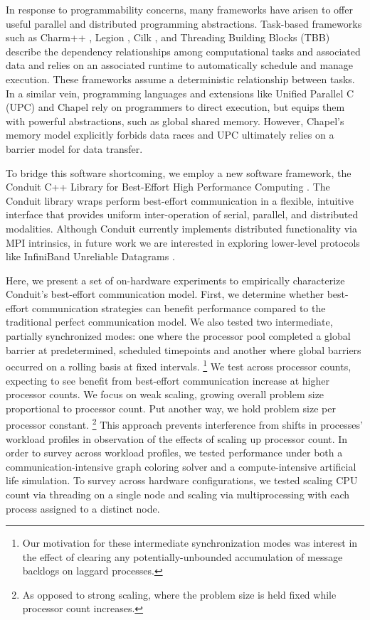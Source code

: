 In response to programmability concerns, many frameworks have arisen to offer useful parallel and distributed programming abstractions.
Task-based frameworks such as Charm++ \cite{kale1993charm++}, Legion \cite{bauer2012legion}, Cilk \cite{blumofe1996cilk}, and Threading Building Blocks (TBB) \cite{reinders2007intel} describe the dependency relationships among computational tasks and associated data and relies on an associated runtime to automatically schedule and manage execution.
These frameworks assume a deterministic relationship between tasks.
In a similar vein, programming languages and extensions like Unified Parallel C (UPC) \cite{el2006upc} and Chapel \cite{chamberlain2007parallel} rely on programmers to direct execution, but equips them with powerful abstractions, such as global shared memory.
However, Chapel's memory model explicitly forbids data races and UPC ultimately relies on a barrier model for data transfer.

To bridge this software shortcoming, we employ a new software framework, the Conduit C++ Library for Best-Effort High Performance Computing \cite{moreno2021conduit}.
The Conduit library wraps perform best-effort communication in a flexible, intuitive interface that provides uniform inter-operation of serial, parallel, and distributed modalities.
Although Conduit currently implements distributed functionality via MPI intrinsics, in future work we are interested in exploring lower-level protocols like InfiniBand Unreliable Datagrams \cite{kashyap2006ip, koop2007high}.

Here, we present a set of on-hardware experiments to empirically characterize Conduit's best-effort communication model.
First, we determine whether best-effort communication strategies can benefit performance compared to the traditional perfect communication model.
We also tested two intermediate, partially synchronized modes: one where the processor pool completed a global barrier at predetermined, scheduled timepoints and another where global barriers occurred on a rolling basis at fixed intervals.
\footnote{
Our motivation for these intermediate synchronization modes was interest in the effect of clearing any potentially-unbounded accumulation of message backlogs on laggard processes.
}
We test across processor counts, expecting to see benefit from best-effort communication increase at higher processor counts.
We focus on weak scaling, growing overall problem size proportional to processor count.
Put another way, we hold problem size per processor constant.
\footnote{
As opposed to strong scaling, where the problem size is held fixed while processor count increases.
}
This approach prevents interference from shifts in processes' workload profiles in observation of the effects of scaling up processor count.
In order to survey across workload profiles, we tested performance under both a communication-intensive graph coloring solver and a compute-intensive artificial life simulation.
To survey across hardware configurations, we tested scaling CPU count via threading on a single node and scaling via multiprocessing with each process assigned to a distinct node.

